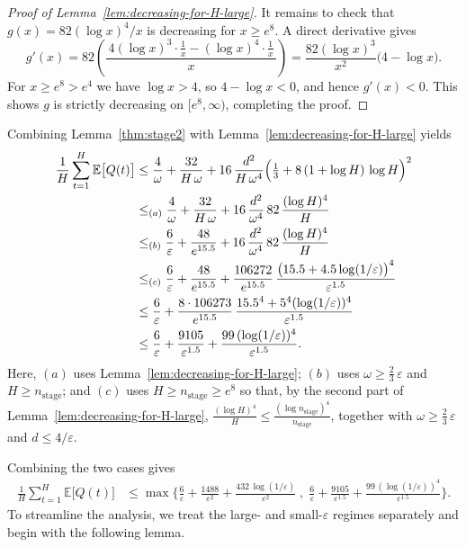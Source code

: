 \documentclass[12pt,draftcls, onecolumn]{IEEEtran}
\newcommand{\velb}{\varepsilon}
\newcommand{\vedisc}{\omega}
\newcommand{\EE}{\mathbb{E}}
\begin{document}
{\begin{proof}[Proof of Lemma~\ref{lem:decreasing-for-H-large}]
It remains to check that \(g(x)=82(\log x)^4/x\) is decreasing for \(x\ge e^{8}\).  A direct derivative gives
\[
g'(x)
=82\left(\frac{\,4(\log x)^3\cdot\frac1x - (\log x)^4\cdot\frac1x\,}{x}\right)
=\frac{82(\log x)^3}{x^2}\bigl(4-\log x\bigr).
\]
For \(x\ge e^{8}> e^4\) we have \(\log x>4\), so \(4-\log x<0\), and hence \(g'(x)<0\).  This shows \(g\) is strictly decreasing on \([e^{8},\infty)\), completing the proof.

\end{proof}


 Combining Lemma~\ref{thm:stage2} with Lemma~\ref{lem:decreasing-for-H-large} yields
\begin{align*}
    \frac{1}{H}\sum_{t=1}^H \EE\bigl[Q(t)\bigr]
    &\le
    \frac{4}{\vedisc}
    + \frac{32}{H\,\vedisc}
    + 16\,\frac{d^2}{H\,\vedisc^4}
    \Bigl(\tfrac13 + 8\,(1+\log H)\,\log H\Bigr)^2
    \\&\le_{(a)}
    \frac{4}{\vedisc}
    + \frac{32}{H\,\vedisc}
    + 16\,\frac{d^2}{\vedisc^4}\,82\,\frac{(\log H)^4}{H}
    \\&\le_{(b)}
    \frac{6}{\velb}
    +\frac{48}{e^{15.5}}
    + 16\,\frac{d^2}{\vedisc^4}\,82\,\frac{(\log H)^4}{H}
    \\&\le_{(c)}
    \frac{6}{\velb}
    +\frac{48}{e^{15.5}}
    +\frac{106272}{e^{15.5}}\,
      \frac{\bigl(15.5 + 4.5\log(1/\velb)\bigr)^4}{\velb^{1.5}}
    \\&\le
    \frac{6}{\velb}
    +\frac{8\cdot 106273}{e^{15.5}}\,
      \frac{{15.5}^4 + 5^4(\log(1/\velb))^4}{\velb^{1.5}}
    \\&\le
    \frac{6}{\velb}
    +\frac{9105}{\velb^{1.5}}
    +\frac{99\,(\log(1/\velb))^4}{\velb^{1.5}}.
\end{align*}
Here, \((a)\) uses Lemma~\ref{lem:decreasing-for-H-large}; \((b)\) uses \(\vedisc \ge  \tfrac{2}{3}\,\velb\) and \(H \ge n_{\text{stage}}\); and \((c)\) uses \(H \ge n_{\text{stage}} \ge e^8\) so that, by the second part of Lemma~\ref{lem:decreasing-for-H-large}, \(\tfrac{(\log H)^4}{H} \le \tfrac{(\log n_{\text{stage}} )^4}{n_{\text{stage}} }\), together with \(\vedisc \ge \tfrac{2}{3}\,\velb\) and \(d \le 4/\velb\).


Combining the two cases gives
\begin{align*}
    \frac{1}{H}\sum_{t=1}^H \EE\bigl[Q(t)\bigr]
    &\le
    \max\!\Biggl\{
    \frac{6}{\velb}
    + \frac{1488}{\velb^2}
    + \frac{432\,\log(1/\velb)}{\velb^2}
    \;,\;
    \frac{6}{\velb}
    +\frac{9105}{\velb^{1.5}}
    +\frac{99\,(\log(1/\velb))^4}{\velb^{1.5}}
    \Biggr\}.
\end{align*}
To streamline the analysis, we treat the large- and small-\(\velb\) regimes separately and begin with the following lemma.

}
\end{document}
